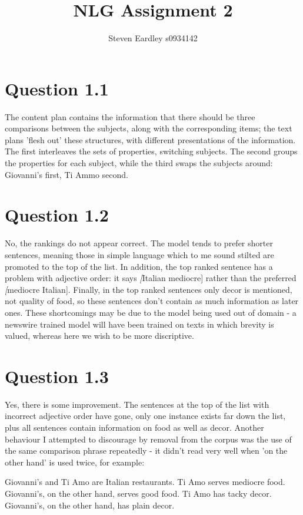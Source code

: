 \documentclass[a4paper,11pt,oneside]{article}
\begin{document}
\title{NLG Assignment 2}
\author{Steven Eardley s0934142}

\section{Question 1.1}
The content plan contains the information that there should be three comparisons between the subjects, along with the corresponding items; the text plans 'flesh out' these structures, with different presentations of the information. The first interleaves the sets of properties, switching subjects. The second groups the properties for each subject, while the third swaps the subjects around: Giovanni's first, Ti Ammo second.

\section{Question 1.2}
No, the rankings do not appear correct. The model tends to prefer shorter sentences, meaning those in simple language which to me sound stilted are promoted to the top of the list. In addition, the top ranked sentence has a problem with adjective order: it says \emph[Italian mediocre] rather than the preferred \emph[mediocre Italian]. Finally, in the top ranked sentences only decor is mentioned, not quality of food, so these sentences don't contain as much information as later ones. These shortcomings may be due to the model being used out of domain - a newswire trained model will have been trained on texts in which brevity is valued, whereas here we wish to be more discriptive.

\section{Question 1.3}
Yes, there is some improvement. The sentences at the top of the list with incorrect adjective order have gone, only one instance exists far down the list, plus all sentences contain information on food as well as decor.  Another behaviour I attempted to discourage by removal from the corpus was the use of the same comparison phrase repeatedly - it didn't read very well when 'on the other hand' is used twice, for example:
    
    Giovanni's and Ti Amo are Italian restaurants. Ti Amo serves mediocre food. Giovanni's, on the other hand, serves good food. Ti Amo has tacky decor. Giovanni's, on the other hand, has plain decor.
\end{document}
